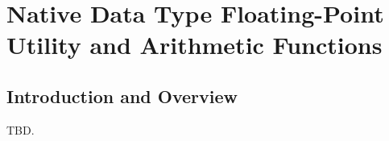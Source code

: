 \chapter{Native Data Type Floating-Point Utility and Arithmetic Functions}
\label{caal1}

\section{Introduction and Overview}
\label{caal1:siov0}

TBD.

